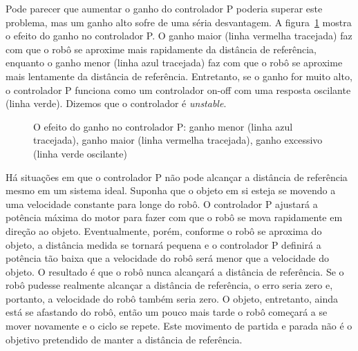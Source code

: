 Pode parecer que aumentar o ganho do controlador P poderia superar este problema, mas um ganho alto sofre de uma séria desvantagem. A figura~\ref{fig.gain} mostra o efeito do ganho no controlador P. O ganho maior (linha vermelha tracejada) faz com que o robô se aproxime mais rapidamente da distância de referência, enquanto o ganho menor (linha azul tracejada) faz com que o robô se aproxime mais lentamente da distância de referência. Entretanto, se o ganho for muito alto, o controlador P funciona como um controlador on-off com uma resposta oscilante (linha verde). Dizemos que o controlador é \emph{unstable}.

\begin{figure}
\begin{center}
\caption{O efeito do ganho no controlador P: ganho menor (linha azul tracejada), ganho maior (linha vermelha tracejada), ganho excessivo (linha verde oscilante)}\label{fig.gain}
\end{center}
\end{figure}

Há situações em que o controlador P não pode alcançar a distância de referência mesmo em um sistema ideal. Suponha que o objeto em si esteja se movendo a uma velocidade constante para longe do robô. O controlador P ajustará a potência máxima do motor para fazer com que o robô se mova rapidamente em direção ao objeto. Eventualmente, porém, conforme o robô se aproxima do objeto, a distância medida se tornará pequena e o controlador P definirá a potência tão baixa que a velocidade do robô será menor que a velocidade do objeto. O resultado é que o robô nunca alcançará a distância de referência. Se o robô pudesse realmente alcançar a distância de referência, o erro seria zero e, portanto, a velocidade do robô também seria zero. O objeto, entretanto, ainda está se afastando do robô, então um pouco mais tarde o robô começará a se mover novamente e o ciclo se repete. Este movimento de partida e parada não é o objetivo pretendido de manter a distância de referência.

